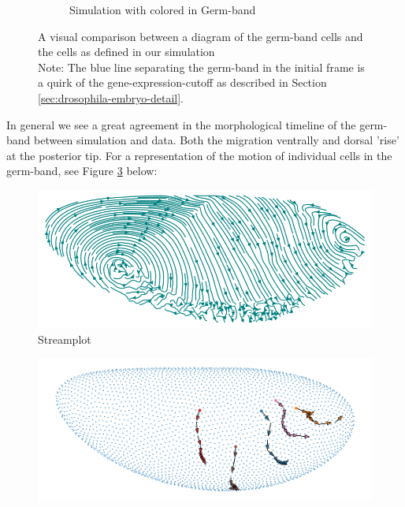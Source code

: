 \begin{figure}[H]
\begin{subfigure}[b]{0.61\textwidth}
    \caption{Simulation with colored in Germ-band}
    \end{subfigure}
    \caption{A visual comparison between a diagram of the germ-band cells and the cells as defined in our simulation\\Note: The blue line separating the germ-band in the initial frame is a quirk of the gene-expression-cutoff as described in Section \ref{sec:drosophila-embryo-detail}.}
    \label{fig:germbandCompare}
\end{figure}


In general we see a great agreement in the morphological timeline of the germ-band between simulation and data. Both the migration ventrally and dorsal 'rise' at the posterior tip. For a representation of the motion of individual cells in the germ-band, see Figure \ref{fig:GBMovements} below:
\begin{figure}[H]
    \centering
    \includegraphics[width=1\linewidth]{chapters/Results/figures/streamplot2.png}
    \caption{Streamplot }
    \label{fig:enter-label}
\end{figure}

\begin{figure}[H]
    \centering
    \includegraphics[width=1\linewidth]{chapters/Results/figures/movements.png}
    \caption{}
    \label{fig:GBMovements}
\end{figure}





